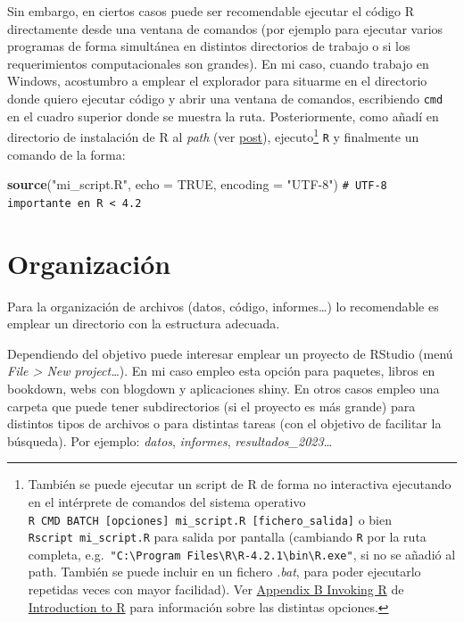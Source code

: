 \documentclass[
]{book}
\newenvironment{Shaded}{\begin{snugshade}}{\end{snugshade}}
\newcommand{\AttributeTok}[1]{\textcolor[rgb]{0.13,0.29,0.53}{#1}}
\newcommand{\CommentTok}[1]{\textcolor[rgb]{0.56,0.35,0.01}{\textit{#1}}}
\newcommand{\ConstantTok}[1]{\textcolor[rgb]{0.56,0.35,0.01}{#1}}
\newcommand{\FunctionTok}[1]{\textcolor[rgb]{0.13,0.29,0.53}{\textbf{#1}}}
\newcommand{\NormalTok}[1]{#1}
\newcommand{\StringTok}[1]{\textcolor[rgb]{0.31,0.60,0.02}{#1}}
\theoremstyle{break}
\theoremstyle{nonumberplain}
\renewcommand{\CommentTok}[1]{\textcolor[rgb]{0.41,0.41,0.41}{\texttt{#1}}}
\let\oldfootnote\footnote
\renewcommand\footnote[1]{\oldfootnote{\hspace{2mm}#1}}
\begin{document}
Sin embargo, en ciertos casos puede ser recomendable ejecutar el código R directamente desde una ventana de comandos (por ejemplo para ejecutar varios programas de forma simultánea en distintos directorios de trabajo o si los requerimientos computacionales son grandes).
En mi caso, cuando trabajo en Windows, acostumbro a emplear el explorador para situarme en el directorio donde quiero ejecutar código y abrir una ventana de comandos, escribiendo \texttt{cmd} en el cuadro superior donde se muestra la ruta.
Posteriormente, como añadí en directorio de instalación de R al \emph{path} (ver \href{https://rubenfcasal.github.io/post/instalacion-de-r/\#rtools}{post}), ejecuto\footnote{También se puede ejecutar un script de R de forma no interactiva ejecutando en el intérprete de comandos del sistema operativo \texttt{R\ CMD\ BATCH\ {[}opciones{]}\ mi\_script.R\ {[}fichero\_salida{]}} o bien \texttt{Rscript\ mi\_script.R} para salida por pantalla (cambiando \texttt{R} por la ruta completa, e.g.~\texttt{"C:\textbackslash{}Program\ Files\textbackslash{}R\textbackslash{}R-4.2.1\textbackslash{}bin\textbackslash{}R.exe"}, si no se añadió al path. También se puede incluir en un fichero \emph{.bat}, para poder ejecutarlo repetidas veces con mayor facilidad). Ver \href{https://cran.r-project.org/doc/manuals/r-release/R-intro.html\#Invoking-R}{Appendix B Invoking R} de \href{https://cran.r-project.org/doc/manuals/r-release/R-intro.html}{Introduction to R} para información sobre las distintas opciones.} \texttt{R} y finalmente un comando de la forma:

\begin{Shaded}
\begin{Highlighting}[]
\FunctionTok{source}\NormalTok{(}\StringTok{"mi\_script.R"}\NormalTok{, }\AttributeTok{echo =} \ConstantTok{TRUE}\NormalTok{, }\AttributeTok{encoding =} \StringTok{"UTF{-}8"}\NormalTok{) }\CommentTok{\# UTF{-}8 importante en R \textless{} 4.2}
\end{Highlighting}
\end{Shaded}

\section{Organización}\label{organizacion}

Para la organización de archivos (datos, código, informes\ldots) lo recomendable es emplear un directorio con la estructura adecuada.

Dependiendo del objetivo puede interesar emplear un proyecto de RStudio (menú \emph{File \textgreater{} New project\ldots{}}).
En mi caso empleo esta opción para paquetes, libros en bookdown, webs con blogdown y aplicaciones shiny.
En otros casos empleo una carpeta que puede tener subdirectorios (si el proyecto es más grande) para distintos tipos de archivos o para distintas tareas (con el objetivo de facilitar la búsqueda).
Por ejemplo: \emph{datos}, \emph{informes}, \emph{resultados\_2023}\ldots{}
\end{document}
